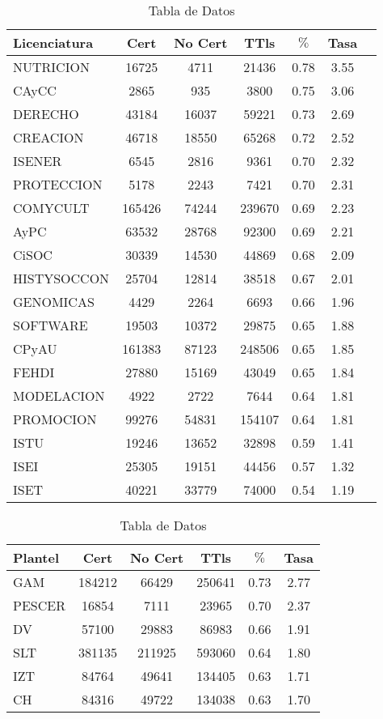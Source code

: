 \documentclass{article}
\begin{document}
\begin{table}
\centering
\begin{tabular}{|l|c|c|c|c|c|c|}
\hline
Licenciatura & Cert & No Cert & TTls & $\%$ & Tasa \\
\hline\hline
NUTRICION & 16725 & 4711 & 21436 & 0.78 & 3.55 \\
CAyCC & 2865 & 935 & 3800 & 0.75 & 3.06 \\\hline\hline
DERECHO & 43184 & 16037 & 59221 & 0.73 & 2.69 \\
CREACION & 46718 & 18550 & 65268 & 0.72 & 2.52 \\\hline\hline
ISENER & 6545 & 2816 & 9361 & 0.70 & 2.32 \\
PROTECCION & 5178 & 2243 & 7421 & 0.70 & 2.31 \\
COMYCULT & 165426 & 74244 & 239670 & 0.69 & 2.23 \\
AyPC & 63532 & 28768 & 92300 & 0.69 & 2.21 \\
CiSOC & 30339 & 14530 & 44869 & 0.68 & 2.09 \\
HISTYSOCCON & 25704 & 12814 & 38518 & 0.67 & 2.01 \\\hline\hline
GENOMICAS & 4429 & 2264 & 6693 & 0.66 & 1.96 \\
SOFTWARE & 19503 & 10372 & 29875 & 0.65 & 1.88 \\
CPyAU & 161383 & 87123 & 248506 & 0.65 & 1.85 \\
FEHDI & 27880 & 15169 & 43049 & 0.65 & 1.84 \\
MODELACION & 4922 & 2722 & 7644 & 0.64 & 1.81 \\
PROMOCION & 99276 & 54831 & 154107 & 0.64 & 1.81 \\\hline\hline
ISTU & 19246 & 13652 & 32898 & 0.59 & 1.41 \\
ISEI & 25305 & 19151 & 44456 & 0.57 & 1.32 \\
ISET & 40221 & 33779 & 74000 & 0.54 & 1.19 \\
\hline\hline
\end{tabular}
\caption{Tabla de Datos}
\label{tab:datos}
\end{table}


\begin{table}
\centering
\begin{tabular}{|l|c|c|c|c|c|}
\hline
Plantel & Cert & No Cert & TTls & $\%$ & Tasa\\
\hline\hline
GAM & 184212 & 66429 & 250641 & 0.73 & 2.77 \\
PESCER & 16854 & 7111 & 23965 & 0.70 & 2.37 \\\hline\hline
DV & 57100 & 29883 & 86983 & 0.66 & 1.91 \\
SLT & 381135 & 211925 & 593060 & 0.64 & 1.80 \\
IZT & 84764 & 49641 & 134405 & 0.63 & 1.71 \\
CH & 84316 & 49722 & 134038 & 0.63 & 1.70 \\\hline\hline
\end{tabular}
\caption{Tabla de Datos}
\label{tab:datos2}
\end{table}
\end{document}
